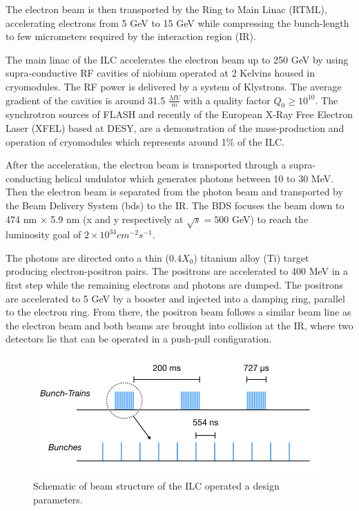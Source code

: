 The electron beam is then transported by the Ring to Main Linac (RTML), accelerating electrons from 5 GeV to 15 GeV while compressing the bunch-length to few micrometers required by the interaction region (IR).

The main linac of the ILC accelerates the electron beam up to 250 GeV by using supra-conductive RF cavities of niobium operated at 2 Kelvins housed in cryomodules. The RF power is delivered by a system of Klystrons. The average gradient of the cavities is around 31.5 $\frac{MV}{m}$ with a quality factor $Q_0 \geqslant 10^{10}$. The synchrotron sources of FLASH and recently of the European X-Ray Free Electron Laser (XFEL) based at DESY, are a demonstration of the mass-production and operation of cryomodules which represents around 1\% of the ILC.

After the acceleration, the electron beam is transported through a supra-conducting helical undulator which generates photons between 10 to 30 MeV. Then the electron beam is separated from the photon beam and transported by the Beam Delivery System (\acrshort{bds}) to the IR. The BDS focuses the beam down to 474 nm $\times$ 5.9 nm (x and y respectively at $\sqrt{s} = 500$ GeV) to reach the luminosity goal of $2 \times 10^{34} cm^{-2}s^{-1}$.

The photons are directed onto a thin ($0.4 X_0$) titanium alloy (Ti) target producing elec\-tron\--positron pairs. The positrons are accelerated to 400 MeV in a first step while the remaining electrons and photons are dumped. The positrons are accelerated to 5 GeV by a booster and injected into a damping ring, parallel to the electron ring. From there, the positron beam follows a similar beam line as the electron beam and both beams are brought into collision at the IR, where two detectors lie that can be operated in a push-pull configuration.

\begin{figure}[htbp!]
  \centering
  \includegraphics[width=0.7\linewidth]{chap2/fig/BeamStructure.jpeg}
  \caption{Schematic of beam structure of the ILC operated a design parameters.} \label{fig:ILC_BeamStruct}
\end{figure}

